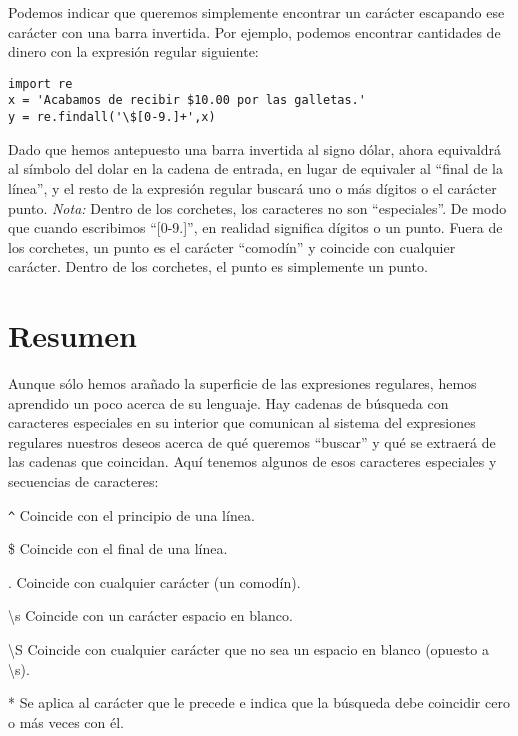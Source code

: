 Podemos indicar que queremos simplemente encontrar un carácter escapando ese carácter con
una barra invertida. Por ejemplo, podemos encontrar cantidades de dinero con la expresión regular
siguiente:

\beforeverb
\begin{verbatim}
import re
x = 'Acabamos de recibir $10.00 por las galletas.'
y = re.findall('\$[0-9.]+',x)
\end{verbatim}
\afterverb
%
Dado que hemos antepuesto una barra invertida al signo dólar, ahora equivaldrá al símbolo del dolar
en la cadena de entrada, en lugar de equivaler al ``final de la línea'', y el resto de la expresión
regular buscará uno o más dígitos o el carácter punto. {\em Nota:} Dentro de los corchetes,
los caracteres no son ``especiales''. De modo que cuando escribimos ``[0-9.]'', en realidad
significa dígitos o un punto. Fuera de los corchetes, un punto es el carácter ``comodín'' y
coincide con cualquier carácter. Dentro de los corchetes, el punto es simplemente un punto.

\section{Resumen}

Aunque sólo hemos arañado la superficie de las expresiones regulares, hemos aprendido un poco
acerca de su lenguaje. Hay cadenas de búsqueda con caracteres especiales en su interior que
comunican al sistema del expresiones regulares nuestros deseos acerca de qué queremos ``buscar''
y qué se extraerá de las cadenas que coincidan. Aquí tenemos algunos de esos caracteres especiales
y secuencias de caracteres:

\verb"^" \newline
Coincide con el principio de una línea.

\$ \newline
Coincide con el final de una línea.

. \newline
Coincide con cualquier carácter (un comodín).

{\textbackslash}s \newline
Coincide con un carácter espacio en blanco.

{\textbackslash}S \newline
Coincide con cualquier carácter que no sea un espacio en blanco (opuesto a {\textbackslash}s).

* \newline
Se aplica al carácter que le precede e indica que la búsqueda debe coincidir cero o más veces con él.


